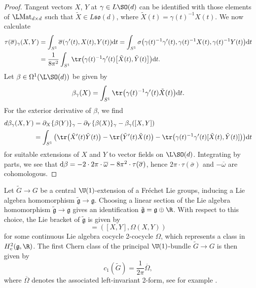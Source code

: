 \begin{proof}
Tangent vectors $X$, $Y$ at $\gamma \in L\SO(d)$ can be identified with those elements of $\L \mathrm{Mat}_{d\times d}$ such that $\tilde{X} \in L\mathfrak{so}(d)$, where $\tilde{X}(t) = \gamma(t)^{-1}X(t)$. We now calculate
 \begin{align*}
 \tau(\overline{\sigma})_\gamma(X, Y)
 &= \int_{S^1} \overline{\sigma}(\gamma^\prime(t), X(t), Y(t)) {\rm d}t= \int_{S^1} \sigma\big( \gamma(t)^{-1}\gamma^\prime(t), \gamma(t)^{-1} X(t), \gamma(t)^{-1}Y(t)\big) {\rm d}t\\
 &= \frac{1}{8 \pi^2}\int_{S^1}\tr\big(\gamma(t)^{-1}\gamma^\prime(t) \big[\tilde{X}(t), \tilde{Y}(t)\big]\big) {\rm d}t.
 \end{align*}
 Let $\beta \in \Omega^1(\L\SO(d))$ be given by
 \begin{equation*}
 \beta_\gamma(X) = \int_{S^1} \tr \big( 	\gamma(t)^{-1}\gamma^\prime(t) \tilde{X}(t)\big) {\rm d}t.
 \end{equation*}
For the exterior derivative of $\beta$, we find
 \begin{align*}
 d\beta_\gamma(X, Y) &= \partial_X \{ \beta(Y)\}_\gamma - \partial_Y \{ \beta(X)\}_\gamma - \beta_\gamma([X, Y]) \\
 &= \int_{S^1} \big( \tr \big(\tilde{X}^\prime(t) \tilde{Y}(t)\big) - \tr \big(\tilde{Y}^\prime(t) \tilde{X}(t)\big) - \tr\big(\gamma(t)^{-1}\gamma^\prime(t) [\tilde{X}(t), \tilde{Y}(t)]\big)\big) {\rm d}t
 \end{align*}
 for suitable extensions of $X$ and $Y$ to vector fields on $\L\SO(d)$.
 Integrating by parts, we see that ${\rm d} \beta = - 2 \cdot 2\pi \cdot \overline{\omega} - 8 \pi^2 \cdot \tau(\overline{\sigma})$, hence $2 \pi \cdot \tau(\overline{\sigma})$ and $-\overline{\omega}$ are cohomologous.
\end{proof}

Let $\tilde{G} \to G$ be a central $\U(1)$-extension of a Fr\'echet Lie groups, inducing a Lie algebra homomorphism $\tilde{\mathfrak{g}} \to \mathfrak{g}$.
Choosing a linear section of the Lie algebra homomorphism $\tilde{\mathfrak{g}} \to \mathfrak{g}$ gives an identification $\tilde{\mathfrak{g}} = \mathfrak{g} \oplus \R$.
With respect to this choice, the Lie bracket of $\tilde{\mathfrak{g}}$ is given by
\begin{equation*}
 	[(X, \lambda), (Y, \mu)] = ([X, Y], \Omega(X, Y))
\end{equation*}
for some continuous Lie algebra cocycle 2-cocycle $\Omega$, which represents a class in $H^2_c(\mathfrak{g}, \R)$.
The first Chern class of the principal $\U(1)$-bundle $\tilde{G} \to G$ is then given by
\begin{equation}
\label{ChernClassVsCocycle}
 c_1(\tilde{G}) = \frac{1}{2\pi} \overline{\Omega}, 	
\end{equation}
where $\overline{\Omega}$ denotes the associated left-invariant 2-form, see for example \cite[Proposition~4.5.6]{PressleySegal}.

